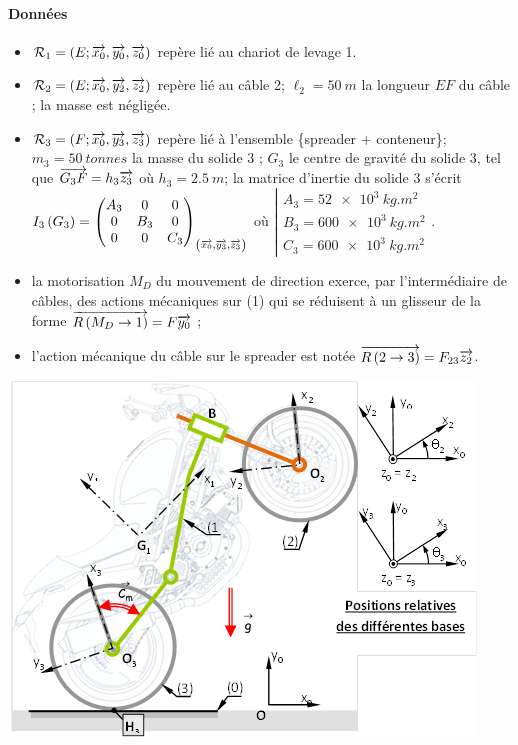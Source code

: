 \documentclass[10pt,fleqn]{article} %
\begin{document}
\begin{multicols}{2}
\paragraph*{Données}
\begin{itemize}
\item $\mathcal{R}_1=\repere{E}{x_0}{y_0}{z_0}$  repère lié au chariot de levage 1.
\item $\mathcal{R}_2=\repere{E}{x_0}{y_2}{z_2}$  repère lié au câble 2; $\ell_2 = \SI{50}{m}$ la longueur $EF$
du câble ; la masse est négligée.
\item $\mathcal{R}_3=\repere{F}{x_0}{y_3}{z_3}$  repère lié à l’ensemble \{spreader + conteneur\};
$m_3 = \SI{50}{tonnes}$ la masse du solide 3 ; $G_3$ le centre de gravité du
solide 3, tel que $\vect{G_3F}=h_3\vect{z_3}$ où $h_3 = \SI{2,5}{m}$; la matrice d’inertie du solide 3 s’écrit
$\inertie{3}{G_3}=\matinertie{A_3}{B_3}{C_3}{0}{0}{0}{\left(\vect{x_0},\vect{y_3},\vect{z_3} \right)}$ où $\left| \begin{array}{l} A_3 = \SI{52e3}{kg.m^2} \\ B_3 = \SI{600e3}{kg.m^2} \\ C_3 = \SI{600e3}{kg.m^2} \end{array}\right.$. 
\item la motorisation $M_D$ du mouvement de direction exerce, par l’intermédiaire de câbles, des actions mécaniques sur (1) qui se réduisent
à un glisseur de la forme $\vectf{M_D}{1} =F \vect{y_0}$ ;
\item l’action mécanique du câble sur le spreader est notée $\vectf{2}{3} =F_{23} \vect{z_2}$.
\end{itemize}



\begin{center}
\includegraphics[width=\linewidth]{images/fig_01}
\end{center}



\end{multicols}
\end{document}
